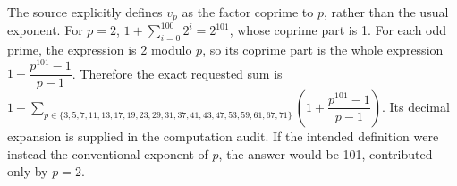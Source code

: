 The source explicitly defines $v_p$ as the factor coprime to $p$, rather than the usual exponent. For $p=2$, $1+\sum_{i=0}^{100}2^i=2^{101}$, whose coprime part is 1. For each odd prime, the expression is 2 modulo $p$, so its coprime part is the whole expression $1+\dfrac{p^{101}-1}{p-1}$. Therefore the exact requested sum is $\boxed{1+\sum_{p\in\{3,5,7,11,13,17,19,23,29,31,37,41,43,47,53,59,61,67,71\}}(1+\dfrac{p^{101}-1}{p-1})}$. Its decimal expansion is supplied in the computation audit. If the intended definition were instead the conventional exponent of $p$, the answer would be 101, contributed only by $p=2$.
